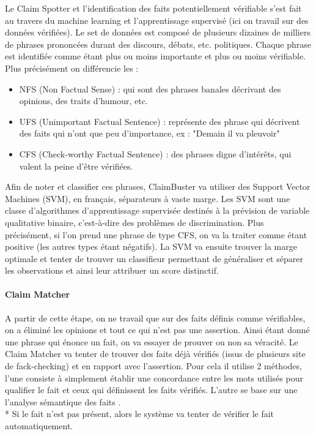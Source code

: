 Le Claim Spotter et l'identification des faits potentiellement vérifiable s'est fait au travers du machine learning et l'apprentissage supervisé (ici on travail sur des données vérifiées). Le set de données est composé de plusieurs dizaines de milliers de phrases prononcées durant des discours, débats, etc. politiques. Chaque phrase est identifiée comme étant plus ou moins importante et plus ou moins vérifiable. Plus précisément on différencie les : 
\begin{itemize}
    \item NFS (Non Factual Sense) : qui sont des phrases banales décrivant des opinions, des traits d'humour, etc. 
    \item UFS (Unimportant Factual Sentence) : représente des phrase qui décrivent des faits qui n'ont que peu d'importance, ex : "Demain il va pleuvoir"
    \item CFS (Check-worthy Factual Sentence) : des phrases digne d'intérêts, qui valent la peine d'être vérifiées. 
\end{itemize}

Afin de noter et classifier ces phrases, ClaimBuster va utiliser des Support Vector Machines (SVM), en français, séparateurs à vaste marge. Les SVM sont une classe d'algorithmes d'apprentissage supervisée destinés à la prévision de variable qualitative binaire, c'est-à-dire des problèmes de discrimination. Plus précisément, si l'on prend une phrase de type CFS, on va la traiter comme étant positive (les autres types étant négatifs). La SVM va ensuite trouver la marge optimale et tenter de trouver un classifieur permettant de généraliser et séparer les observations et ainsi leur attribuer un score distinctif.

\paragraph{Claim Matcher}

A partir de cette étape, on ne travail que sur des faits définis comme vérifiables, on a éliminé les opinions et tout ce qui n'est pas une assertion. Ainsi étant donné une phrase qui énonce un fait, on va essayer de prouver ou non sa véracité. Le Claim Matcher va tenter de trouver des faits déjà vérifiés (issus de plusieurs site de fack-checking) et en rapport avec l'assertion. Pour cela il utilise 2 méthodes, l'une consiste à simplement établir une concordance entre les mots utilisés pour qualifier le fait et ceux qui définissent les faits vérifiés. L'autre se base sur une l'analyse sémantique des faits \cite{rus2013semilar}. 
\\*
Si le fait n'est pas présent, alors le système va tenter de vérifier le fait automatiquement.


